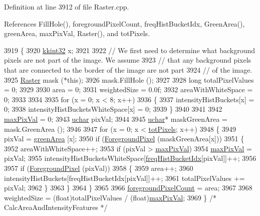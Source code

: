Definition at line 3912 of file Raster.\+cpp.



References Fill\+Hole(), foreground\+Pixel\+Count, freq\+Hist\+Bucket\+Idx, Green\+Area(), green\+Area, max\+Pix\+Val, Raster(), and tot\+Pixels.


\begin{DoxyCode}
3919 \{
3920   \hyperlink{namespace_k_k_b_a8fa4952cc84fda1de4bec1fbdd8d5b1b}{kkint32}  x;
3921 
3922   \textcolor{comment}{// We first need to determine what background pixels are not part of the image.  We assume}
3923   \textcolor{comment}{// that any background pixels that are connected to the border of the image are not part}
3924   \textcolor{comment}{// of the image.}
3925   \hyperlink{class_k_k_b_1_1_raster}{Raster}  mask (*\textcolor{keyword}{this});
3926   mask.FillHole ();
3927   
3928   \textcolor{keywordtype}{long}  totalPixelValues = 0;
3929 
3930   area               = 0;
3931   weightedSize       = 0.0f;
3932   areaWithWhiteSpace = 0;
3933 
3934 
3935   \textcolor{keywordflow}{for}  (x = 0;  x < 8;  x++)
3936   \{
3937    intensityHistBuckets[x] = 0;
3938    intensityHistBucketsWhiteSpace[x] = 0;
3939   \}
3940 
3941 
3942   \hyperlink{class_k_k_b_1_1_raster_a4f37d3b83826f522f61af0918a1d5546}{maxPixVal} = 0;
3943   \hyperlink{namespace_k_k_b_ace9969169bf514f9ee6185186949cdf7}{uchar}  pixVal;
3944 
3945   \hyperlink{namespace_k_k_b_ace9969169bf514f9ee6185186949cdf7}{uchar}*  maskGreenArea = mask.GreenArea ();
3946 
3947   \textcolor{keywordflow}{for}  (x = 0;  x < \hyperlink{class_k_k_b_1_1_raster_a9b08c4a0ca0a35435a478599635f1dc0}{totPixels};  x++)
3948   \{
3949     pixVal = \hyperlink{class_k_k_b_1_1_raster_ad981258f1f7284a8bd0cd0466f328cdf}{greenArea} [x];
3950     \textcolor{keywordflow}{if}  (\hyperlink{class_k_k_b_1_1_raster_aa1e1363589e719eb64f0957281b84b6a}{ForegroundPixel} (maskGreenArea[x]))
3951     \{
3952       areaWithWhiteSpace++;
3953       \textcolor{keywordflow}{if}  (pixVal > \hyperlink{class_k_k_b_1_1_raster_a4f37d3b83826f522f61af0918a1d5546}{maxPixVal})
3954         \hyperlink{class_k_k_b_1_1_raster_a4f37d3b83826f522f61af0918a1d5546}{maxPixVal} = pixVal;
3955       intensityHistBucketsWhiteSpace[\hyperlink{_raster_8cpp_af53de902c57701041c19ab771f77f9c2}{freqHistBucketIdx}[pixVal]]++;
3956       
3957       \textcolor{keywordflow}{if}  (\hyperlink{class_k_k_b_1_1_raster_aa1e1363589e719eb64f0957281b84b6a}{ForegroundPixel} (pixVal))
3958       \{
3959         area++;
3960         intensityHistBuckets[freqHistBucketIdx[pixVal]]++;
3961         totalPixelValues += pixVal;
3962       \}
3963     \}
3964   \}
3965 
3966   \hyperlink{class_k_k_b_1_1_raster_aa7e86253f4b9c347da718732e44b60e8}{foregroundPixelCount} = area;
3967 
3968   weightedSize = (float)totalPixelValues / (\textcolor{keywordtype}{float})\hyperlink{class_k_k_b_1_1_raster_a4f37d3b83826f522f61af0918a1d5546}{maxPixVal};
3969 \}  \textcolor{comment}{/* CalcAreaAndIntensityFeatures */}
\end{DoxyCode}
